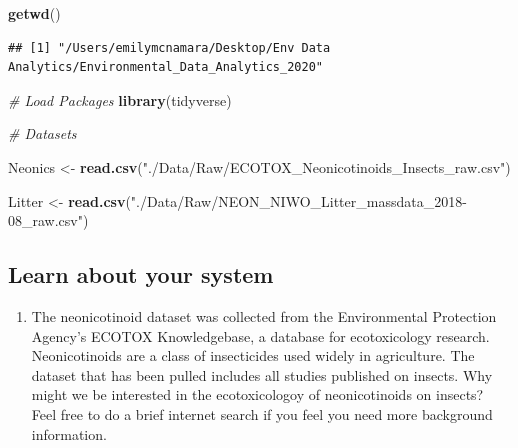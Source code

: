 \documentclass[]{article}
\newenvironment{Shaded}{\begin{snugshade}}{\end{snugshade}}
\newcommand{\KeywordTok}[1]{\textcolor[rgb]{0.13,0.29,0.53}{\textbf{#1}}}
\newcommand{\StringTok}[1]{\textcolor[rgb]{0.31,0.60,0.02}{#1}}
\newcommand{\CommentTok}[1]{\textcolor[rgb]{0.56,0.35,0.01}{\textit{#1}}}
\newcommand{\NormalTok}[1]{#1}
\providecommand{\tightlist}{%
  \setlength{\itemsep}{0pt}\setlength{\parskip}{0pt}}
\begin{document}
\begin{Shaded}
\begin{Highlighting}[]
\KeywordTok{getwd}\NormalTok{()}
\end{Highlighting}
\end{Shaded}

\begin{verbatim}
## [1] "/Users/emilymcnamara/Desktop/Env Data Analytics/Environmental_Data_Analytics_2020"
\end{verbatim}

\begin{Shaded}
\begin{Highlighting}[]
\CommentTok{# Load Packages}
\KeywordTok{library}\NormalTok{(tidyverse)}

\CommentTok{# Datasets}

\NormalTok{Neonics <-}\StringTok{ }\KeywordTok{read.csv}\NormalTok{(}\StringTok{"./Data/Raw/ECOTOX_Neonicotinoids_Insects_raw.csv"}\NormalTok{)}


\NormalTok{Litter <-}\StringTok{ }\KeywordTok{read.csv}\NormalTok{(}\StringTok{"./Data/Raw/NEON_NIWO_Litter_massdata_2018-08_raw.csv"}\NormalTok{)}
\end{Highlighting}
\end{Shaded}

\subsection{Learn about your system}\label{learn-about-your-system}

\begin{enumerate}
\def\labelenumi{\arabic{enumi}.}
\setcounter{enumi}{1}
\tightlist
\item
  The neonicotinoid dataset was collected from the Environmental
  Protection Agency's ECOTOX Knowledgebase, a database for ecotoxicology
  research. Neonicotinoids are a class of insecticides used widely in
  agriculture. The dataset that has been pulled includes all studies
  published on insects. Why might we be interested in the ecotoxicologoy
  of neonicotinoids on insects? Feel free to do a brief internet search
  if you feel you need more background information.
\end{enumerate}
\end{document}
